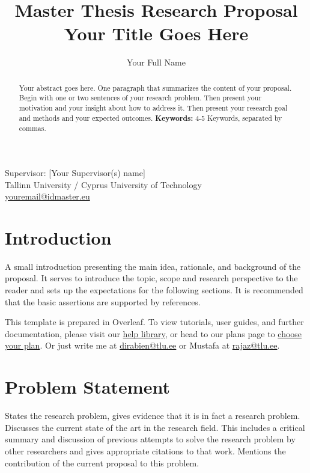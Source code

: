 \documentclass{article}
\title{%
    \textbf{Master Thesis Research Proposal}\\
    \vfill
    \textbf{Your Title Goes Here}
    }
\author{Your Full Name}
\begin{document}
\maketitle

{\centering
    Supervisor: [Your Supervisor(s) name]\\
    \vfill
    Tallinn University / Cyprus University of Technology\\
    \href{mailto: youremail@idmaster.eu}{youremail@idmaster.eu}\\ %
    }

\begin{abstract}
Your abstract goes here. One paragraph that summarizes the content of your proposal. Begin with one or two sentences of your research problem. Then present your motivation and your insight about how to address it. Then present your research goal and methods and your expected outcomes.
\vfill
\textbf{Keywords:} 4-5 Keywords, separated by commas.
\end{abstract}


\section{Introduction}
A small introduction presenting the main idea, rationale, and background of the proposal. It serves to introduce the topic, scope and research perspective to the reader and sets up the expectations for the following sections. It is recommended that the basic assertions are supported by references.

This template is prepared in Overleaf. To view tutorials, user guides, and further documentation, please visit our \href{https://www.overleaf.com/learn}{help library}, or head to our plans page to \href{https://www.overleaf.com/user/subscription/plans}{choose your plan}. Or just write me at \href{mailto: dirabien@tlu.ee}{dirabien@tlu.ee} or Mustafa at \href{mailto: rajaz@tlu.ee}{rajaz@tlu.ee}.

\section{Problem Statement}
States the research problem, gives evidence that it is in fact a research problem.
Discusses the current state of the art in the research field. This includes a critical summary and discussion of previous attempts to solve the research problem by other researchers and gives appropriate citations to that work.
Mentions the contribution of the current proposal to this problem.
\end{document}
